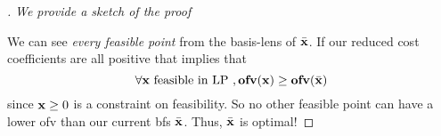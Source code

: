 \begin{proof}[]
	\textit{We provide a sketch of the proof}

We can see \textit{every feasible point} from the basis-lens of $\bar{\mathbf{x}}$. If our
reduced cost coefficients are all positive that implies that
$$\forall \mathbf{x} \text{ feasible in LP },  \textbf{ofv}(\mathbf{x}) \geq \textbf{ofv}(\bar{\mathbf{x}})$$
since $\mathbf{x} \geq 0$ is a constraint on feasibility.
So no other feasible point can 
have a lower ofv than our current bfs $\bar{\mathbf{x}}$. Thus, $\bar{\mathbf{x}}$ is optimal!
\end{proof}

